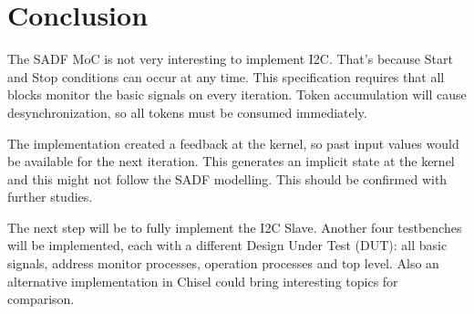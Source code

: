 \documentclass{article}
\begin{document}

\section{Conclusion} \label{sec:concl}
The SADF MoC is not very interesting to implement I2C. That's because Start and Stop conditions can occur at any time. This specification requires that all blocks monitor the basic signals on every iteration. Token accumulation will cause desynchronization, so all tokens must be consumed immediately.



The implementation created a feedback at the kernel, so past input values would be available for the next iteration. This generates an implicit state at the kernel and this might not follow the SADF modelling. This should be confirmed with further studies.

The next step will be to fully implement the I2C Slave. Another four testbenches will be implemented, each with a different Design Under Test (DUT): all basic signals, address monitor processes, operation processes and top level. Also an alternative implementation in Chisel could bring interesting topics for comparison.
\end{document}
